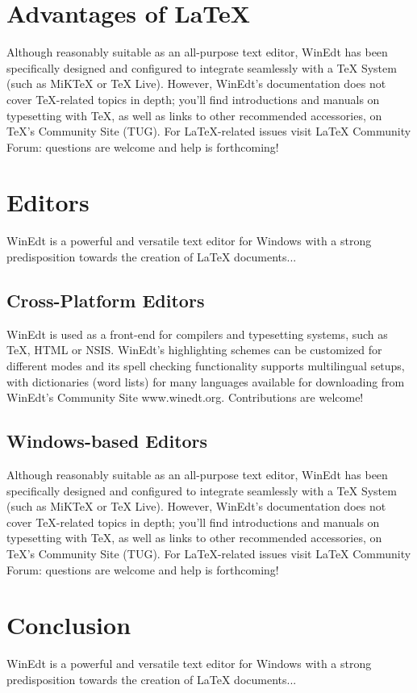 \documentclass[11pt,a4paper,twocolumn]{article}
\begin{document}
	\section{Advantages of \LaTeX{}} \label{section.latex}
	
	Although reasonably suitable as an all-purpose text editor, WinEdt has been specifically designed and configured to integrate seamlessly with a TeX System (such as MiKTeX or TeX Live). However, WinEdt's documentation does not cover TeX-related topics in depth; you'll find introductions and manuals on typesetting with TeX, as well as links to other recommended accessories, on TeX's Community Site (TUG). For LaTeX-related issues visit LaTeX Community Forum: questions are welcome and help is forthcoming!
	
	\section{Editors} \label{section.editors}
	
	WinEdt is a powerful and versatile text editor for Windows with a strong predisposition towards the creation of LaTeX documents...
	
	\subsection{Cross-Platform Editors} \label{section.editors.cross}
	
	WinEdt is used as a front-end for compilers and typesetting systems, such as TeX, HTML or NSIS. WinEdt's highlighting schemes can be customized for different modes and its spell checking functionality supports multilingual setups, with dictionaries (word lists) for many languages available for downloading from WinEdt's Community Site www.winedt.org. Contributions are welcome!
	
	\subsection{Windows-based Editors} \label{section.editors.win}
	
	Although reasonably suitable as an all-purpose text editor, WinEdt has been specifically designed and configured to integrate seamlessly with a TeX System (such as MiKTeX or TeX Live). However, WinEdt's documentation does not cover TeX-related topics in depth; you'll find introductions and manuals on typesetting with TeX, as well as links to other recommended accessories, on TeX's Community Site (TUG). For LaTeX-related issues visit LaTeX Community Forum: questions are welcome and help is forthcoming!
	
	\section{Conclusion} \label{section.conclusion}
	
	WinEdt is a powerful and versatile text editor for Windows with a strong predisposition towards the creation of LaTeX documents...
	
\end{document}
